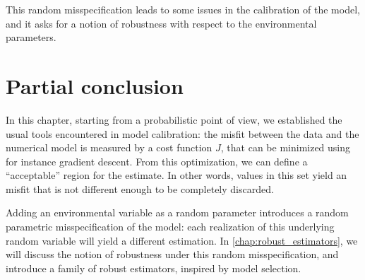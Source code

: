 \documentclass[../../Main_ManuscritThese.tex]{subfiles}
\begin{document}
 This random misspecification leads to some issues in the calibration of the model, and it asks for a notion of robustness with respect to the environmental parameters. 

\section{Partial conclusion}
\label{sec:chap2_partial}

In this chapter, starting from a probabilistic point of view, we established the usual tools encountered in model calibration: the misfit between the data and the numerical model is measured by a cost function $J$, that can be minimized using for instance gradient descent. From this optimization, we can define a ``acceptable'' region for the estimate. In other words, values in this set yield an misfit that is not different enough to be completely discarded.

Adding an environmental variable as a random parameter introduces a random parametric misspecification of the model: each realization of this underlying random variable will yield a different estimation. In \cref{chap:robust_estimators}, we will discuss the notion of robustness under this random misspecification, and introduce a family of robust estimators, inspired by model selection. 




\subfileLocal{
	\pagestyle{empty}
	
	
}
\end{document}
